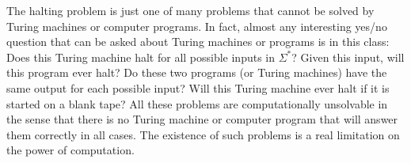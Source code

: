 The halting problem is just one
of many problems that cannot be solved by Turing machines or
computer programs.  In fact, almost any interesting yes/no
question that can be asked about Turing machines or programs
is in this class:  Does this Turing machine halt for all possible
inputs in $\Sigma^*$?  Given this input, will this program
ever halt?  Do these two programs (or Turing machines) have
the same output for each possible input?  Will this Turing
machine ever halt if it is started on a blank tape?
All these problems are computationally unsolvable in the
sense that there is no Turing machine or computer program
that will answer them correctly in all cases. The
existence of such problems is a real limitation on the
power of computation.






\endinput

